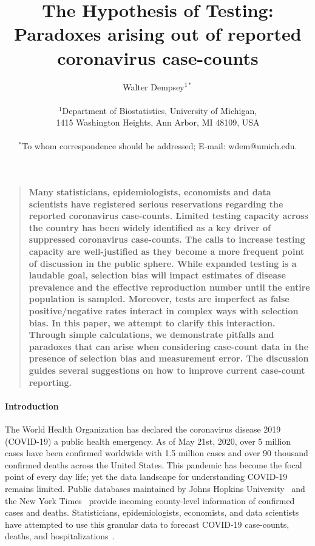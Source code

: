 \documentclass[12pt]{article}
\title{The Hypothesis of Testing: Paradoxes arising out of reported coronavirus case-counts}
\author
{Walter Dempsey$^{1\ast}$\\
\\
\normalsize{$^{1}$Department of Biostatistics, University of Michigan,}\\
\normalsize{1415 Washington Heights, Ann Arbor, MI 48109, USA}\\
\\
\normalsize{$^\ast$To whom correspondence should be addressed; E-mail:  wdem@umich.edu.}
}
\date{}
\newenvironment{sciabstract}{%
\begin{quote} \bf}
{\end{quote}}
\begin{document}

\baselineskip24pt


\maketitle




\begin{sciabstract}
  Many statisticians, epidemiologists, economists and data scientists have registered serious reservations regarding the reported coronavirus case-counts. Limited testing capacity across the country has been widely identified as a key driver of suppressed coronavirus case-counts.  The calls to increase testing capacity are well-justified as they become a more frequent point of discussion in the public sphere.  While expanded testing is a laudable goal, selection bias will impact estimates of disease prevalence and the effective reproduction number until the entire population is sampled.  Moreover, tests are imperfect as false positive/negative rates interact in complex ways with selection bias.  In this paper, we attempt to clarify this interaction.  Through simple calculations, we demonstrate pitfalls and paradoxes that can arise when considering case-count data in the presence of selection bias and measurement error. The discussion guides several suggestions on how to improve current case-count reporting.
\end{sciabstract}

\paragraph*{Introduction}

The World Health Organization has declared the coronavirus disease 2019 (COVID-19) a public health emergency.  As of May 21st, 2020, over 5 million cases have been confirmed worldwide with 1.5 million cases and over 90 thousand confirmed deaths across the United States. This pandemic
has become the focal point of every day life; yet the data landscape for understanding COVID-19 remains limited.  Public databases maintained by Johns Hopkins University~\cite{JHU_Lancet} and the New York Times~\cite{NYT} provide incoming county-level information of confirmed cases and deaths.  Statisticians, epidemiologists, economists, and data scientists have attempted to use this granular data to forecast COVID-19 case-counts, deaths, and hospitalizations~\cite{Song2020,Ray2020,2020.IHME}.
\end{document}
